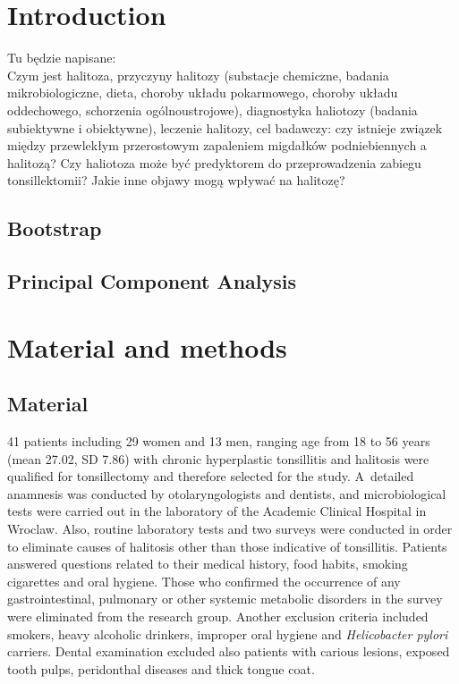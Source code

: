 \documentclass[12pt,a4paper,notitlepage]{report}
\begin{document}

\tableofcontents



\clearpage
\linespread{1.3}
\chapter{Introduction}
Tu będzie napisane: \\
Czym  jest halitoza, przyczyny halitozy (substacje chemiczne, badania mikrobiologiczne, dieta, choroby układu pokarmowego, choroby układu oddechowego, schorzenia ogólnoustrojowe), diagnostyka haliotozy (badania subiektywne i obiektywne), leczenie halitozy, cel badawczy: czy istnieje związek między przewlekłym przerostowym zapaleniem migdałków podniebiennych a halitozą? Czy haliotoza może być predyktorem do przeprowadzenia zabiegu tonsillektomii? Jakie inne objawy mogą wpływać na halitozę?

\section{Bootstrap}

\section{Principal Component Analysis}

\chapter{Material and methods}
\section{Material}

41 patients including 29 women and 13 men, ranging age from 18 to 56 years (mean 27.02, SD 7.86) with chronic hyperplastic tonsillitis and halitosis were qualified for tonsillectomy and therefore selected for the study. \mbox{A detailed} anamnesis was conducted by otolaryngologists and dentists, and microbiological tests were carried out in the laboratory of the Academic Clinical Hospital in Wroclaw. Also, routine laboratory tests and two surveys were conducted in order to eliminate causes of halitosis other than those indicative of tonsillitis. Patients answered questions related to their medical history, food habits, smoking cigarettes and oral hygiene. 
Those who confirmed the occurrence of any gastrointestinal, pulmonary or other systemic metabolic disorders in the survey were eliminated from the research group.
Another exclusion criteria included smokers, heavy alcoholic drinkers, improper oral hygiene and \textit{Helicobacter pylori} carriers. Dental examination excluded also patients with carious lesions, exposed tooth pulps, peridonthal diseases and thick tongue coat.
\end{document}
